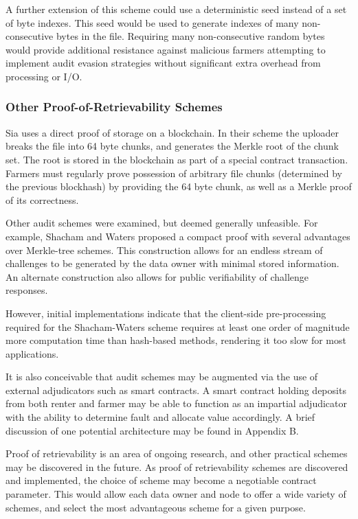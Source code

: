\documentclass[a4paper,10pt]{article}
\begin{document}
A further extension of this scheme could use a deterministic seed instead of a set of byte indexes. This seed would be used to generate indexes of many non-consecutive bytes in the file. Requiring many non-consecutive random bytes would provide additional resistance against malicious farmers attempting to implement audit evasion strategies without significant extra overhead from processing or I/O.

\subsubsection{Other Proof-of-Retrievability Schemes}
Sia \cite{32} uses a direct proof of storage on a blockchain. In their scheme the uploader breaks the file into 64 byte chunks, and generates the Merkle root of the chunk set. The root is stored in the blockchain as part of a special contract transaction. Farmers must regularly prove possession of arbitrary file chunks (determined by the previous blockhash) by providing the 64 byte chunk, as well as a Merkle proof of its correctness.

Other audit schemes were examined, but deemed generally unfeasible. For example, Shacham and Waters proposed a compact proof \cite{6} with several advantages over Merkle-tree schemes. This construction allows for an endless stream of challenges to be generated by the data owner with minimal stored information. An alternate construction also allows for public verifiability of challenge responses.

However, initial implementations indicate that the client-side pre-processing required for the Shacham-Waters scheme requires at least one order of magnitude more computation time than hash-based methods, rendering it too slow for most applications.

It is also conceivable that audit schemes may be augmented via the use of external adjudicators such as smart contracts. A smart contract holding deposits from both renter and farmer may be able to function as an impartial adjudicator with the ability to determine fault and allocate value accordingly. A brief discussion of one potential architecture may be found in Appendix B.

Proof of retrievability is an area of ongoing research, and other practical schemes may be discovered in the future. As proof of retrievability schemes are discovered and implemented, the choice of scheme may become a negotiable contract parameter. This would allow each data owner and node to offer a wide variety of schemes, and select the most advantageous scheme for a given purpose.
\end{document}
